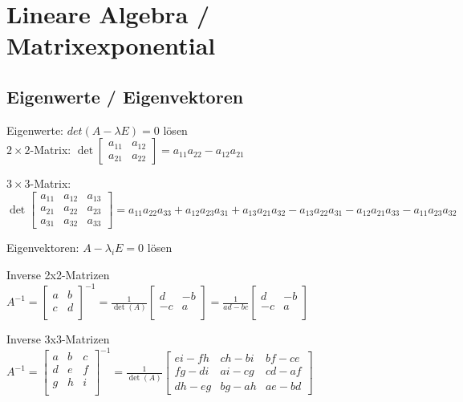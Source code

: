 \section{Lineare Algebra / Matrixexponential}
\subsection{Eigenwerte / Eigenvektoren}
Eigenwerte:
$det(A-\lambda E) = 0$ lösen\\
$2 \times 2$-Matrix:
$\det
 \begin{bmatrix}
 a_{11} & a_{12} \\
 a_{21} & a_{22}
 \end{bmatrix}
= a_{11} a_{22} - a_{12} a_{21}$

$3 \times 3$-Matrix:
$\det
 \begin{bmatrix}
 a_{11} & a_{12} & a_{13} \\
 a_{21} & a_{22} & a_{23} \\
 a_{31} & a_{32} & a_{33}
 \end{bmatrix} = a_{11} a_{22} a_{33} +a_{12} a_{23} a_{31} + a_{13} a_{21} a_{32} - a_{13} a_{22} a_{31} - a_{12} a_{21} a_{33} - a_{11} a_{23} a_{32}$

Eigenvektoren: $A-\lambda_i E = 0$ lösen

Inverse 2x2-Matrizen\\
$A^{-1} = \begin{bmatrix}
a & b \\ c & d \\
\end{bmatrix}^{-1} =
\frac{1}{\det(A)} \begin{bmatrix}
d & -b \\ -c & a \\
\end{bmatrix}  =
\frac{1}{ad-bc} \begin{bmatrix}
d & -b \\ -c & a \\
\end{bmatrix}$

Inverse 3x3-Matrizen\\
$A^{-1} = \begin{bmatrix}
a & b & c\\ d & e & f \\ g & h & i \\
\end{bmatrix}^{-1} =
\frac{1}{\det(A)} \begin{bmatrix}
ei - fh & ch - bi & bf - ce \\
fg - di & ai - cg & cd - af \\
dh - eg & bg - ah & ae - bd
\end{bmatrix}$

